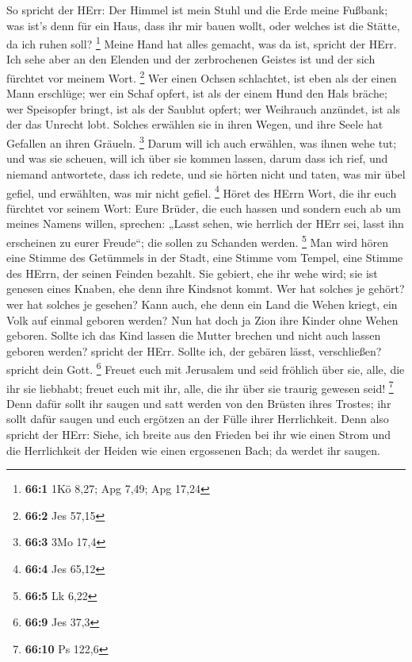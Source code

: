  So spricht der HErr: Der Himmel ist mein Stuhl und die Erde
meine Fußbank; was ist's denn für ein Haus, dass ihr mir bauen wollt,
oder welches ist die Stätte, da ich ruhen soll? \footnote{\textbf{66:1}
  1Kö 8,27; Apg 7,49; Apg 17,24}  Meine Hand hat alles
gemacht, was da ist, spricht der HErr. Ich sehe aber an den Elenden und
der zerbrochenen Geistes ist und der sich fürchtet vor meinem Wort.
\footnote{\textbf{66:2} Jes 57,15}  Wer einen Ochsen
schlachtet, ist eben als der einen Mann erschlüge; wer ein Schaf opfert,
ist als der einem Hund den Hals bräche; wer Speisopfer bringt, ist als
der Saublut opfert; wer Weihrauch anzündet, ist als der das Unrecht
lobt. Solches erwählen sie in ihren Wegen, und ihre Seele hat Gefallen
an ihren Gräueln. \footnote{\textbf{66:3} 3Mo 17,4}  Darum
will ich auch erwählen, was ihnen wehe tut; und was sie scheuen, will
ich über sie kommen lassen, darum dass ich rief, und niemand antwortete,
dass ich redete, und sie hörten nicht und taten, was mir übel gefiel,
und erwählten, was mir nicht gefiel. \footnote{\textbf{66:4} Jes 65,12}
 Höret des HErrn Wort, die ihr euch fürchtet vor seinem
Wort: Eure Brüder, die euch hassen und sondern euch ab um meines Namens
willen, sprechen: „Lasst sehen, wie herrlich der HErr sei, lasst ihn
erscheinen zu eurer Freude``; die sollen zu Schanden werden. \footnote{\textbf{66:5}
  Lk 6,22}  Man wird hören eine Stimme des Getümmels in der
Stadt, eine Stimme vom Tempel, eine Stimme des HErrn, der seinen Feinden
bezahlt.  Sie gebiert, ehe ihr wehe wird; sie ist genesen
eines Knaben, ehe denn ihre Kindsnot kommt.  Wer hat solches
je gehört? wer hat solches je gesehen? Kann auch, ehe denn ein Land die
Wehen kriegt, ein Volk auf einmal geboren werden? Nun hat doch ja Zion
ihre Kinder ohne Wehen geboren.  Sollte ich das Kind lassen
die Mutter brechen und nicht auch lassen geboren werden? spricht der
HErr. Sollte ich, der gebären lässt, verschließen? spricht dein Gott.
\footnote{\textbf{66:9} Jes 37,3}  Freuet euch mit
Jerusalem und seid fröhlich über sie, alle, die ihr sie liebhabt; freuet
euch mit ihr, alle, die ihr über sie traurig gewesen seid! \footnote{\textbf{66:10}
  Ps 122,6}  Denn dafür sollt ihr saugen und satt werden
von den Brüsten ihres Trostes; ihr sollt dafür saugen und euch ergötzen
an der Fülle ihrer Herrlichkeit.  Denn also spricht der
HErr: Siehe, ich breite aus den Frieden bei ihr wie einen Strom und die
Herrlichkeit der Heiden wie einen ergossenen Bach; da werdet ihr saugen.
